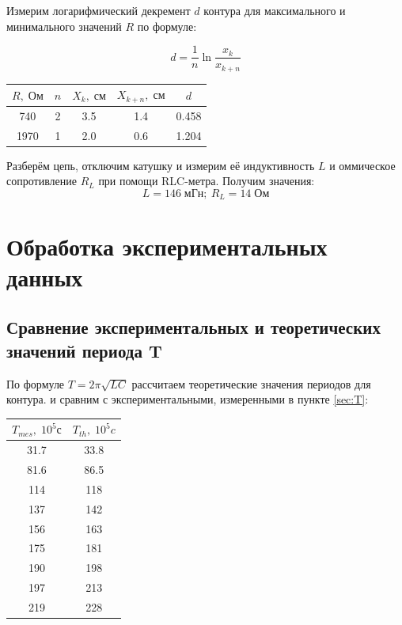 \documentclass[11pt]{article}
\begin{document}
Измерим логарифмический декремент \(d\) контура для максимального и минимального значений \(R\) по формуле:

\[ d = \frac{1}{n}\ln\frac{x_k}{x_{k+n}} \]

\begin{table}[H]
    \centering
    \begin{tabular}{|c|c|c|c|c|}
        \hline
    \(R,\; Ом\) & \(n\) & \(X_k,\; см\) & \(X_{k+n},\; см\) & \(d\) \\\hline
    740  & 2 & 3.5 & 1.4 & 0.458 \\\hline
    1970 & 1 & 2.0 & 0.6 & 1.204 \\\hline
    \end{tabular}
\end{table}

Разберём цепь, отключим катушку и измерим её индуктивность \(L\) и оммическое сопротивление \(R_L\) при помощи
RLC-метра. Получим значения:
\[ L = 146\; мГн;\: R_L = 14\;Ом \]

\section{Обработка экспериментальных данных}
\subsection{Сравнение экспериментальных и теоретических значений периода T} \label{sec:T-T}

По формуле \( T = 2\pi\sqrt{LC} \) рассчитаем теоретические значения периодов для контура. и сравним с экспериментальными,
измеренными в пункте \ref{sec:T}:

\begin{table}[H]
    \centering
    \begin{tabular}{|c|c|}
        \hline
        \(T_{mes},\; 10^5 с\) & \(T_{th},\; 10^5c\) \\\hline
        31.7    & 33.8 \\\hline
        81.6    & 86.5 \\\hline
        114     & 118  \\\hline
        137     & 142  \\\hline
        156     & 163  \\\hline
        175     & 181  \\\hline
        190     & 198  \\\hline
        197     & 213  \\\hline
        219     & 228  \\\hline
    \end{tabular}
\end{table}
\end{document}

